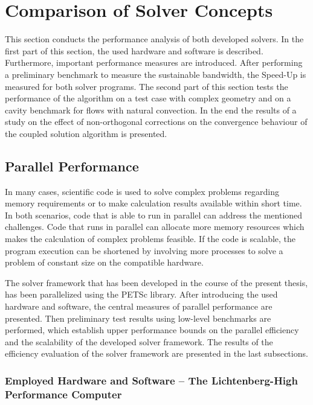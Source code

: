 \section{Comparison of Solver Concepts}
\label{sec:compare}

This section conducts the performance analysis of both developed solvers. In the first part of this section, the used hardware and software is described. Furthermore, important performance measures are introduced. After performing a preliminary benchmark to measure the sustainable bandwidth, the Speed-Up is measured for both solver programs. The second part of this section tests the performance of the algorithm on a test case with complex geometry and on a cavity benchmark for flows with natural convection. In the end the results of a study on the effect of non-orthogonal corrections on the convergence behaviour of the coupled solution algorithm is presented.
  
\subsection{Parallel Performance}

In many cases, scientific code is used to solve complex problems regarding memory requirements or to make calculation results available within short time. In both scenarios, code that is able to run in parallel can address the mentioned challenges. Code that runs in parallel can allocate more memory resources which makes the calculation of complex problems feasible. If the code is scalable, the program execution can be shortened by involving more processes to solve a problem of constant size on the compatible hardware.

The solver framework that has been developed in the course of the present thesis, has been parallelized using the PETSc library. After introducing the used hardware and software, the central measures of parallel performance are presented. Then preliminary test results using low-level benchmarks are performed, which establish upper performance bounds on the parallel efficiency and the scalability of the developed solver framework. The results of the efficiency evaluation of the solver framework are presented in the last subsections.

\subsubsection{Employed Hardware and Software -- The Lichtenberg-High Performance Computer }
\label{sec:hhlr}

